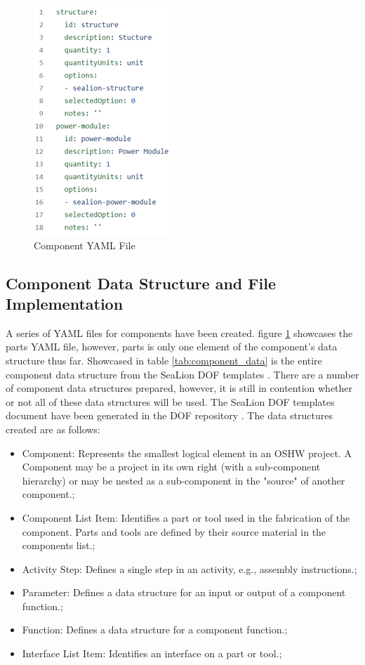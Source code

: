 \documentclass[journal,article,submit,pdftex,moreauthors]{Definitions/mdpi}
\begin{document}
\begin{figure}[H]
    \includegraphics[width=5 cm]{assets/components.png}
    \caption{Component YAML File}
	\label{fig:components}
    \end{figure}   
\unskip

\subsection{Component Data Structure and File Implementation}
A series of YAML files for components have been created.  figure \ref{fig:components} showcases the parts YAML file, however, parts is only one element of the component's data structure thus far.  Showcased in table \ref{tab:component_data} is the entire component data structure from the SeaLion DOF templates \cite{sealion_dof}.  There are a number of component data structures prepared, however, it is still in contention whether or not all of these data structures will be used.  The SeaLion DOF templates document have been generated in the DOF repository \cite{sealion_dof}.  The data structures created are as follows:

\begin{itemize}
	\item	Component: Represents the smallest logical element in an OSHW project. A Component may be a project in its own right (with a sub-component hierarchy) or may be nested as a sub-component in the "source" of another component.;
	\item	Component List Item: Identifies a part or tool used in the fabrication of the component. Parts and tools are defined by their source material in the components list.;
	\item	Activity Step: Defines a single step in an activity, e.g., assembly instructions.;
	\item	Parameter: Defines a data structure for an input or output of a component function.;
	\item	Function: Defines a data structure for a component function.;
	\item	Interface List Item: Identifies an interface on a part or tool.;
\end{itemize}
\end{document}
